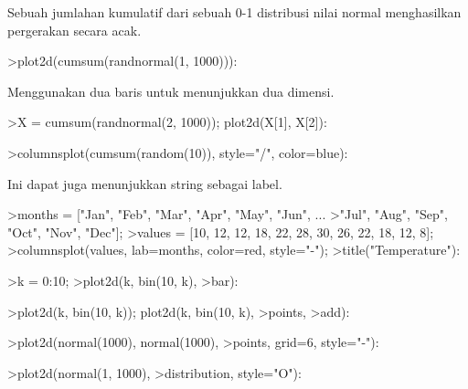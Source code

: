 \documentclass[a4paper,10pt]{article}
\begin{document}
\begin{eulernotebook}
\begin{eulercomment}
\begin{eulercomment}
\begin{eulercomment}
\begin{eulercomment}
\begin{eulercomment}
Sebuah jumlahan kumulatif dari sebuah 0-1 distribusi nilai normal
menghasilkan pergerakan secara acak.
\end{eulercomment}
\begin{eulerprompt}
>plot2d(cumsum(randnormal(1, 1000))):
\end{eulerprompt}
\begin{eulercomment}
Menggunakan dua baris untuk menunjukkan dua dimensi.
\end{eulercomment}
\begin{eulerprompt}
>X = cumsum(randnormal(2, 1000)); plot2d(X[1], X[2]):
\end{eulerprompt}
\begin{eulerprompt}
>columnsplot(cumsum(random(10)), style="/", color=blue):
\end{eulerprompt}
\begin{eulercomment}
Ini dapat juga menunjukkan string sebagai label.
\end{eulercomment}
\begin{eulerprompt}
>months = ["Jan", "Feb", "Mar", "Apr", "May", "Jun", ...
>"Jul", "Aug", "Sep", "Oct", "Nov", "Dec"];
>values = [10, 12, 12, 18, 22, 28, 30, 26, 22, 18, 12, 8];
>columnsplot(values, lab=months, color=red, style="-");
>title("Temperature"):
\end{eulerprompt}
\begin{eulerprompt}
>k = 0:10;
>plot2d(k, bin(10, k), >bar):
\end{eulerprompt}
\begin{eulerprompt}
>plot2d(k, bin(10, k)); plot2d(k, bin(10, k), >points, >add):
\end{eulerprompt}
\begin{eulerprompt}
>plot2d(normal(1000), normal(1000), >points, grid=6, style="-"):
\end{eulerprompt}
\begin{eulerprompt}
>plot2d(normal(1, 1000), >distribution, style="O"):
\end{eulerprompt}

\end{eulercomment}
\end{eulercomment}
\end{eulercomment}
\end{eulercomment}
\end{eulernotebook}
\end{document}
